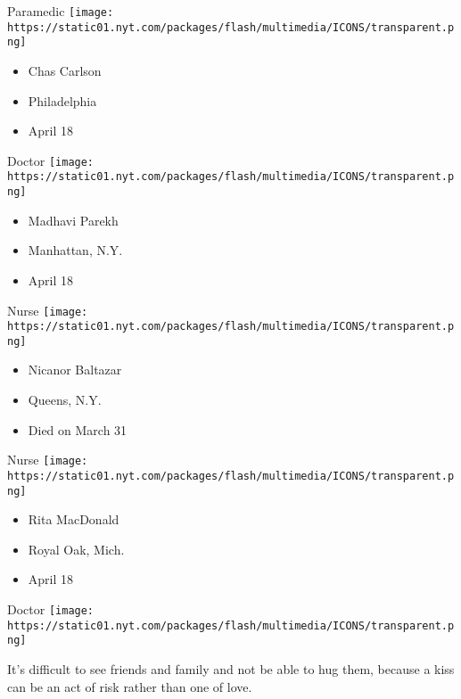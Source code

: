\protect\hyperlink{item-chas-carlson}{}

Paramedic
\texttt{[image: https://static01.nyt.com/packages/flash/multimedia/ICONS/transparent.png]}

\begin{itemize}
\tightlist
\item
  Chas Carlson
\item
  Philadelphia
\item
  April 18
\end{itemize}

\protect\hyperlink{item-madhavi-parekh}{}

Doctor
\texttt{[image: https://static01.nyt.com/packages/flash/multimedia/ICONS/transparent.png]}

\begin{itemize}
\tightlist
\item
  Madhavi Parekh
\item
  Manhattan, N.Y.
\item
  April 18
\end{itemize}

\protect\hyperlink{item-nicanor-baltazar}{}

Nurse
\texttt{[image: https://static01.nyt.com/packages/flash/multimedia/ICONS/transparent.png]}

\begin{itemize}
\tightlist
\item
  Nicanor Baltazar
\item
  Queens, N.Y.
\item
  Died on March 31
\end{itemize}

\protect\hyperlink{item-rita-macdonald}{}

Nurse
\texttt{[image: https://static01.nyt.com/packages/flash/multimedia/ICONS/transparent.png]}

\begin{itemize}
\tightlist
\item
  Rita MacDonald
\item
  Royal Oak, Mich.
\item
  April 18
\end{itemize}

\protect\hyperlink{item-jose-satue}{}

Doctor
\texttt{[image: https://static01.nyt.com/packages/flash/multimedia/ICONS/transparent.png]}

It's difficult to see friends and family and not be able to hug them,
because a kiss can be an act of risk rather than one of love.

